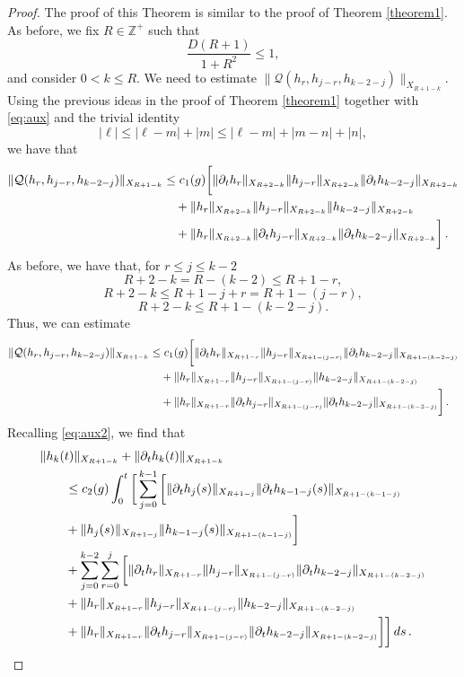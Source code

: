 \documentclass[11pt]{article}
\theoremstyle{plain}
\theoremstyle{definition}
\theoremstyle{definition}
\def\bbZ{{\mathbb Z}}
\def\Q{{\mathcal Q}}
\def\p{\text{\bf\emph{p}}}
\def\p{{\partial\hspace{1pt}}}
\begin{document}
\begin{proof}
The proof of this Theorem is similar to the proof of Theorem \ref{theorem1}. As before, we fix $R\in \bbZ^+$ such that
$$
\frac{D(R+1)}{1+R^2}\leq 1,
$$
and consider $0<k\leq R$. We need to estimate $\|\Q(h_r,h_{j-r},h_{k-2-j})\|_{X_{R+1-k}}$. Using the previous ideas in the proof of Theorem \ref{theorem1} together with \eqref{eq:aux} and the trivial identity
$$
|\ell|\leq |\ell-m|+|m|\leq |\ell-m|+|m-n|+|n|,
$$
we have that
\begin{align*}
\|\Q(h_r,h_{j-r},h_{k-2-j})\|_{X_{R+1-k}}&\leq c_1(g)\bigg{[}\|\p_{\!t} h_r\|_{X_{R+2-k}}\|h_{j-r}\|_{X_{R+2-k}}\|\p_{\!t}h_{k-2-j}\|_{X_{R+2-k}}\\
&\quad+\|h_r\|_{X_{R+2-k}}\|h_{j-r}\|_{X_{R+2-k}}\|h_{k-2-j}\|_{X_{R+2-k}}\\
&\quad+\|h_r\|_{X_{R+2-k}}\|\p_{\!t}h_{j-r}\|_{X_{R+2-k}}\|\p_{\!t}h_{k-2-j}\|_{X_{R+2-k}}\bigg{]}\,.
\end{align*}
As before, we have that,  for $r\leq j\leq k-2$
$$
R+2-k=R-(k-2)\leq R+1-r,
$$
$$
R+2-k\leq R+1-j+r=R+1-(j-r),
$$
$$
R+2-k\leq R+1-(k-2-j).
$$
Thus, we can estimate
\begin{align*}
\|\Q(h_r,h_{j-r},h_{k-2-j})\|_{X_{R+1-k}}&\leq c_1(g)\bigg{[}\|\p_{\!t} h_r\|_{X_{R+1-r}}\|h_{j-r}\|_{X_{R+1-(j-r)}}\|\p_{\!t}h_{k-2-j}\|_{X_{R+1-(k-2-j)}}\\
&\quad+\|h_r\|_{X_{R+1-r}}\|h_{j-r}\|_{X_{R+1-(j-r)}}\|h_{k-2-j}\|_{X_{R+1-(k-2-j)}}\\
&\quad+\| h_r\|_{X_{R+1-r}}\|\p_{\!t}h_{j-r}\|_{X_{R+1-(j-r)}}\|\p_{\!t}h_{k-2-j}\|_{X_{R+1-(k-2-j)}}\bigg{]}\,.
\end{align*}
Recalling \eqref{eq:aux2}, we find that
\begin{align*}
& \|h_k(t)\|_{X_{R+1-k}}+\|\p_{\!t} h_k(t)\|_{X_{R+1-k}}\nonumber\\
&\qquad\leq c_2(g)\int_0^t\bigg{[}\sum_{j=0}^{k-1}\bigg{[}\|\p_{\!t}h_{j}(s)\|_{X_{R+1-j}}\|\p_{\!t}h_{k-1-j}(s)\|_{X_{R+1-(k-1-j)}}\nonumber\\
&\qquad+\|h_{j}(s)\|_{X_{R+1-j}}\|h_{k-1-j}(s)\|_{X_{R+1-(k-1-j)}}\bigg{]}\\
&\qquad+\sum_{j=0}^{k-2}\sum_{r=0}^{j}\bigg{[}\|\p_{\!t} h_r\|_{X_{R+1-r}}\|h_{j-r}\|_{X_{R+1-(j-r)}}\|\p_{\!t}h_{k-2-j}\|_{X_{R+1-(k-2-j)}}\\
&\qquad+\|h_r\|_{X_{R+1-r}}\|h_{j-r}\|_{X_{R+1-(j-r)}}\|h_{k-2-j}\|_{X_{R+1-(k-2-j)}}\\
&\qquad+\| h_r\|_{X_{R+1-r}}\|\p_{\!t}h_{j-r}\|_{X_{R+1-(j-r)}}\|\p_{\!t}h_{k-2-j}\|_{X_{R+1-(k-2-j)}}\bigg{]}\bigg{]}\,ds\,.

\end{align*}
\end{proof}
\end{document}
